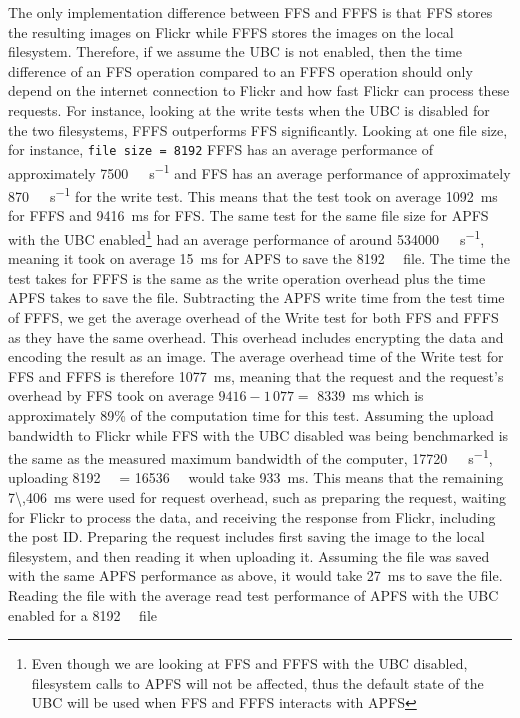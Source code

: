 The only implementation difference between \gls{FFS} and \gls{FFFS} is that \gls{FFS} stores the resulting images on Flickr while \gls{FFFS} stores the images on the local filesystem. Therefore, if we assume the \gls{UBC} is not enabled, then the time difference of an \gls{FFS} operation compared to an \gls{FFFS} operation should only depend on the internet connection to Flickr and how fast Flickr can process these requests. For instance, looking at the write tests when the \gls{UBC} is disabled for the two filesystems, \gls{FFFS} outperforms \gls{FFS} significantly. Looking at one file size, for instance, \texttt{file size = \num{8192}} \gls{FFFS} has an average performance of approximately \SI[per-mode = symbol]{7500}{\kilo\byte\per\second} and \gls{FFS} has an average performance of approximately \SI[per-mode = symbol]{870}{\kilo\byte\per\second} for the write test. This means that the test took on average \SI{1092}{\milli\second} for \gls{FFFS} and \SI{9416}{\milli\second} for \gls{FFS}. The same test for the same file size for \gls{APFS} with the \gls{UBC} enabled\footnote{Even though we are looking at \gls{FFS} and \gls{FFFS} with the \gls{UBC} disabled, filesystem calls to \gls{APFS} will not be affected, thus the default state of the \gls{UBC} will be used when \gls{FFS} and \gls{FFFS} interacts with \gls{APFS}} had an average performance of around \SI[per-mode = symbol]{534000}{\kilo\byte\per\second}, meaning it took on average \SI[per-mode = symbol]{15}{\milli\second} for \gls{APFS} to save the \SI[per-mode = symbol]{8192}{\kilo\byte} file. The time the test takes for \gls{FFFS} is the same as the write operation overhead plus the time \gls{APFS} takes to save the file. Subtracting the \gls{APFS} write time from the test time of \gls{FFFS}, we get the average overhead of the Write test for both \gls{FFS} and \gls{FFFS} as they have the same overhead. This overhead includes encrypting the data and encoding the result as an image. The average overhead time of the Write test for \gls{FFS} and \gls{FFFS} is therefore \SI[per-mode = symbol]{1077}{\milli\second}, meaning that the request and the request's overhead by \gls{FFS} took on average $\num{9416} - 1\,077 =$ \SI{8339}{\milli\second} which is approximately 89\% of the computation time for this test. Assuming the upload bandwidth to Flickr while \gls{FFS} with the \gls{UBC} disabled was being benchmarked is the same as the measured maximum bandwidth of the computer, \ie \SI[per-mode = symbol]{17720}{\kilo\bit\per\second}, uploading \SI[per-mode = symbol]{8192}{\kilo\byte} = \SI[per-mode = symbol]{16536}{\kilo\bit} would take \SI[per-mode = symbol]{933}{\milli\second}. This means that the remaining \SI[per-mode = symbol]{7\,406}{\milli\second} were used for request overhead, such as preparing the request, waiting for Flickr to process the data, and receiving the response from Flickr, including the post ID. Preparing the request includes first saving the image to the local filesystem, and then reading it when uploading it. Assuming the file was saved with the same \gls{APFS} performance as above, it would take \SI[per-mode = symbol]{27}{\milli\second} to save the file. Reading the file with the average read test performance of \gls{APFS} with the \gls{UBC} enabled for a \SI[per-mode = symbol]{8192}{\kilo\byte} file 